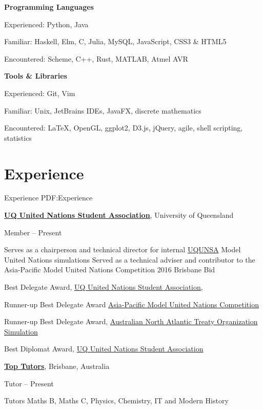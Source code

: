 \documentclass[a4paper,10pt,oneside]{article}
\begin{document}
\begin{body}
\textbf{Programming Languages}
\par Experienced: Python, Java
\par Familiar: Haskell, Elm, C, Julia, MySQL, JavaScript, CSS3 \& HTML5
\par Encountered: Scheme, C++, Rust, MATLAB, Atmel AVR

\EntryGap

\textbf{Tools \& Libraries}
\par Experienced: Git, Vim
\par Familiar: Unix, JetBrains IDEs, JavaFX, discrete mathematics
\par Encountered: \LaTeX, OpenGL, ggplot2, D3.js, jQuery, agile, shell scripting, statistics


\section
{Experience}
{Experience}
{PDF:Experience}

\href{http://www.unsauq.org/}
{\textbf{UQ United Nations Student Association}}, University of Queensland

\par Member \hfill {} -- Present

\begin{detail}
\BulletItem Serves as a chairperson and technical director for internal \href{http://www.unsauq.org/}{UQUNSA} Model United Nations simulations 
\BulletItem Served as a technical adviser and contributor to the Asia-Pacific Model United Nations Competition 2016 Brisbane Bid
\end{detail}

\par Best Delegate Award, \href{http://www.unsauq.org/}{UQ United Nations Student Association}, \hfill {}
\par Runner-up Best Delegate Award \href{http://www.amunc.net/}{Asia-Pacific Model United Nations Competition} \hfill {}
\par Runner-up Best Delegate Award, \href{http://www.ausnatos.org/}{Australian North Atlantic Treaty Organization Simulation} \hfill {}
\par Best Diplomat Award, \href{http://www.unsauq.org/}{UQ United Nations Student Association} \hfill {}

\EntryGap

\href{https://www.toptutors.com.au/}{\textbf{Top Tutors}}, Brisbane, Australia
\par Tutor \hfill {} -- Present
\begin{detail}
Tutors Maths B, Maths C, Physics, Chemistry, IT and Modern History
\end{detail}


\end{body}
\end{document}
